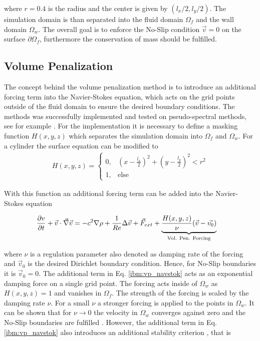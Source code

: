 where $r=0.4$ is the radius and the center is given by $(l_x/2, l_y/2)$.
The simulation domain is than separated into the fluid domain $\Omega_f$ and the wall domain $\Omega_w$.
The overall goal is to enforce the No-Slip condition $\vec{v} = 0$ on the surface $\partial \Omega_f$, furthermore
the conservation of mass should be fulfilled.


\subsection{Volume Penalization}
\label{chap:ibm_volpen}
The concept behind the volume penalization method is to introduce an additional forcing term into the Navier-Stokes equation, which acts on
the grid points outside of the fluid domain to ensure the desired boundary conditions. The methods was successfully implemented and tested
on pseudo-spectral methods, see for example \citep{Lulff2011}.
For the implementation it is necessary to define a masking function $H(x, y, z)$ which separates the simulation domain into $\Omega_f$ and $\Omega_w$.
For a cylinder the surface equation \label{ibm:eq_cylinder_intro} can be modified to
\begin{align}
    \label{ibm:masking_function}
H(x, y, z) = \begin{cases}
                    0, &  \left(x - \frac{l_x}{2}\right)^2 + \left(y - \frac{l_y}{2}\right)^2 <r^2\\
                    1, & \text{else}
             \end{cases}
\end{align}

With this function an additional forcing term can be added into the Navier-Stokes equation

\begin{align}
    \label{ibm:vp_navstok}
    \pdn[v]{t} + \vec{v} \cdot \vec{\nabla} \vec{v} &= -c^2 \nabla \rho + \frac{1}{Re} \Delta \vec{v} + \vec{F}_{ext}
     +\underbrace{ \frac{H(x, y, z)}{\nu}(\vec{v} - \vec{v_0})}_{\text{Vol. Pen. Forcing}}
\end{align}

where $\nu$ is a regulation parameter also denoted as damping rate of the forcing and $\vec{v}_0$ is the desired Dirichlet boundary condition.
Hence, for No-Slip boundaries it is $\vec{v}_0 = 0 $.
The additional term in Eq. \ref{ibm:vp_navstok} acts as an exponential damping force on a single grid point.
The forcing acts inside of $\Omega_w$ as $H(x, y, z) = 1$ and vanishes in $\Omega_f$.
The strength of the forcing is scaled by the damping rate $\nu$.
For a small $\nu$ a stronger forcing is applied to the points in $\Omega_w$.
It can be shown that for $\nu\rightarrow 0$ the velocity in $\Omega_w$ converges against zero
and the No-Slip boundaries are fulfilled \citep{Lulff2011}.
However, the additional term in Eq. \ref{ibm:vp_navstok}
also introduces an additional stability criterion \citep{Lulff2011}, that is


